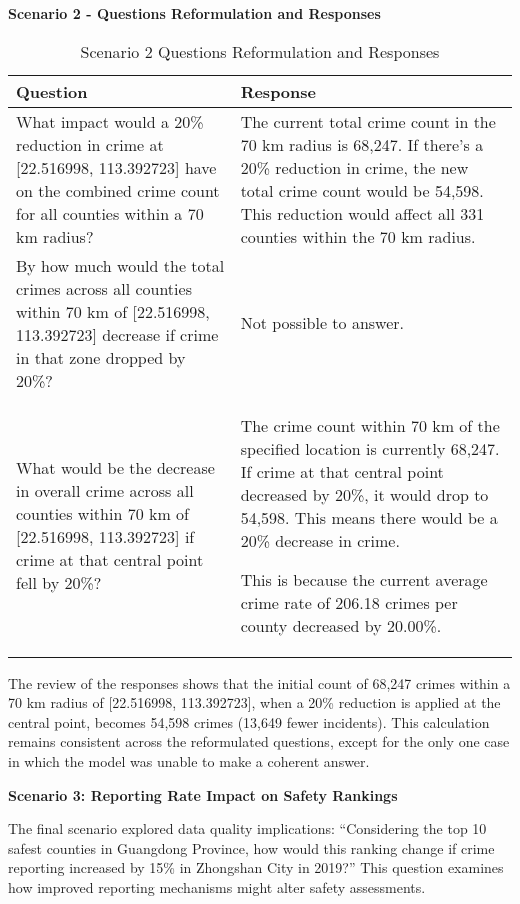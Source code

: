 \noindent \textbf{Scenario 2 - Questions Reformulation and Responses}
\begin{table}[hbtp]
\centering
\small
\begin{tabular}{|p{}|p{}|}
\hline
\textbf{Question} & \textbf{Response} \\
\hline
What impact would a 20\% reduction in crime at [22.516998, 113.392723] have on the combined crime count for all counties within a 70 km radius? & The current total crime count in the 70 km radius is 68,247. If there's a 20\% reduction in crime, the new total crime count would be 54,598. This reduction would affect all 331 counties within the 70 km radius. \\
\hline
 By how much would the total crimes across all counties within 70 km of [22.516998, 113.392723] decrease if crime in that zone dropped by 20\%? & Not possible to answer. \\
\hline
What would be the decrease in overall crime across all counties within 70 km of [22.516998, 113.392723] if crime at that central point fell by 20\%? & 
The crime count within 70 km of the specified location is currently 68,247. If crime at that central point decreased by 20\%, it would drop to 54,598. This means there would be a 20\% decrease in crime.

This is because the current average crime rate of 206.18 crimes per county decreased by 20.00\%. \\
\hline
\end{tabular}
\caption{Scenario 2 Questions Reformulation and Responses}
\label{tab:questions_responses_2}
\end{table}

The review of the responses shows that the initial count of 68,247 crimes within a 70 km radius of [22.516998, 113.392723], when a 20\% reduction is applied at the central point, becomes 54,598 crimes (13,649 fewer incidents). This calculation remains consistent across the reformulated questions, except for the only one case in which the model was unable to make a coherent answer.


\noindent \textbf{Scenario 3: Reporting Rate Impact on Safety Rankings}

The final scenario explored data quality implications: ``Considering the top 10 safest counties in Guangdong Province, how would this ranking change if crime reporting increased by 15\% in Zhongshan City in 2019?'' This question examines how improved reporting mechanisms might alter safety assessments.

